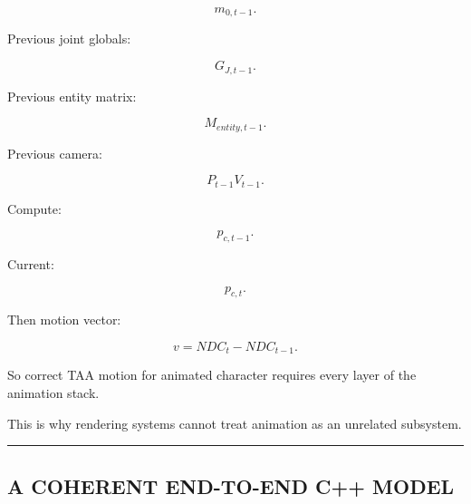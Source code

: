 \[
m_{0,t-1}.
\]

Previous joint globals:

\[
G_{J,t-1}.
\]

Previous entity matrix:

\[
M_{entity,t-1}.
\]

Previous camera:

\[
P_{t-1}V_{t-1}.
\]

Compute:

\[
p_{c,t-1}.
\]

Current:

\[
p_{c,t}.
\]

Then motion vector:

\[
v=
NDC_t-NDC_{t-1}.
\]

So correct TAA motion for animated character requires every layer of the animation stack.

This is why rendering systems cannot treat animation as an unrelated subsystem.

\begin{center}\rule{0.5\linewidth}{0.5pt}\end{center}

\subsection{A COHERENT END-TO-END C++ MODEL}\label{04-visual-computing-ii-ch041-a-coherent-end-to-end-c-model}


